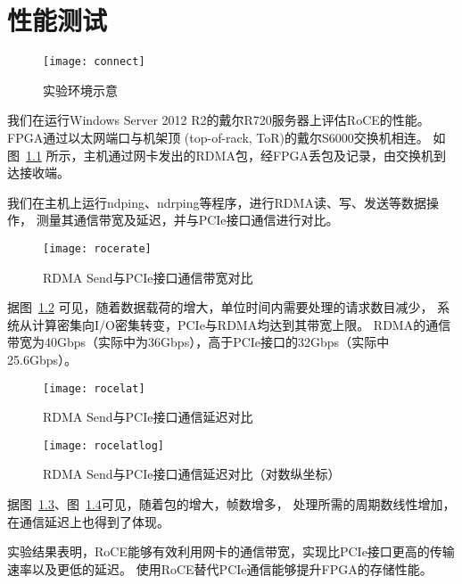 \chapter{性能测试}
\begin{figure}[htbp]
\centering
\texttt{[image: connect]}
\caption{实验环境示意}\label{fig:connect}
\end{figure}
我们在运行Windows Server 2012 R2的戴尔R720服务器上评估RoCE的性能。
FPGA通过以太网端口与机架顶 (top-of-rack, ToR)的戴尔S6000交换机\cite{s6000}相连。
如图~\ref{fig:connect} 所示，主机通过网卡发出的RDMA包，经FPGA丢包及记录，由交换机到达接收端。

我们在主机上运行ndping、ndrping等程序，进行RDMA读、写、发送等数据操作，
测量其通信带宽及延迟，并与PCIe接口通信进行对比。

\begin{figure}[htbp]
\centering
\texttt{[image: rocerate]}
\caption{RDMA Send与PCIe接口通信带宽对比}\label{fig:rocerate}
\end{figure}

据图~\ref{fig:rocerate} 可见，随着数据载荷的增大，单位时间内需要处理的请求数目减少，
系统从计算密集向I/O密集转变，PCIe与RDMA均达到其带宽上限。
RDMA的通信带宽为40Gbps（实际中为36Gbps），高于PCIe接口的32Gbps（实际中25.6Gbps）。

\begin{figure}[htbp]
\centering
\texttt{[image: rocelat]}
\caption{RDMA Send与PCIe接口通信延迟对比}\label{fig:rocelat}
\end{figure}

\begin{figure}[htbp]
\centering
\texttt{[image: rocelatlog]}
\caption{RDMA Send与PCIe接口通信延迟对比（对数纵坐标）}\label{fig:rocelatlog}
\end{figure}

据图~\ref{fig:rocelat}、图~\ref{fig:rocelatlog}可见，随着包的增大，帧数增多，
处理所需的周期数线性增加，在通信延迟上也得到了体现。

实验结果表明，RoCE能够有效利用网卡的通信带宽，实现比PCIe接口更高的传输速率以及更低的延迟。
使用RoCE替代PCIe通信能够提升FPGA的存储性能。
